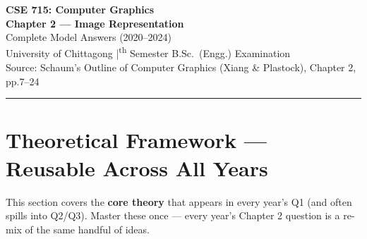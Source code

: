 \documentclass[12pt, a4paper]{article}
\begin{document}

\begin{center}
  {\LARGE\bfseries\color{sectionblue} CSE 715: Computer Graphics}\\[0.6em]
  {\Large\bfseries Chapter 2 --- Image Representation}\\[0.3em]
  {\large Complete Model Answers (2020--2024)}\\[0.2em]
  {\normalsize University of Chittagong \quad|\textsuperscript{th} Semester B.Sc.\ (Engg.) Examination}\\[0.3em]
  {\small Source: Schaum's Outline of Computer Graphics (Xiang \& Plastock), Chapter 2, pp.7--24}
\end{center}

\vspace{0.3em}
\noindent\rule{\linewidth}{1pt}
\vspace{0.5em}

\tableofcontents
\newpage

\section{Theoretical Framework --- Reusable Across All Years}
This section covers the \textbf{core theory} that appears in every year's Q1 (and often spills into Q2/Q3). Master these once — every year's Chapter 2 question is a re-mix of the same handful of ideas.

\end{document}
